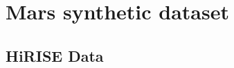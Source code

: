 \section{Mars synthetic dataset}
\label{sec:mars_synthetic_dataset}



\subsection{HiRISE Data}
\label{subsec:hirise} 

